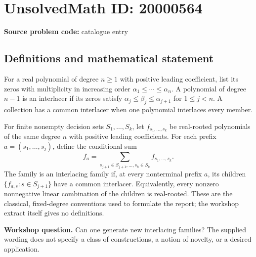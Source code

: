 \documentclass[11pt]{article}
\begin{document}
\section*{UnsolvedMath ID: 20000564}
\textbf{Source problem code:} catalogue entry
\subsection{Definitions and mathematical statement}
For a real polynomial of degree $n\geq 1$ with positive leading coefficient, list its zeros with multiplicity in increasing order $\alpha_1\leq\cdots\leq\alpha_n$. A polynomial of degree $n-1$ is an interlacer if its zeros satisfy $\alpha_j\leq\beta_j\leq\alpha_{j+1}$ for $1\leq j<n$. A collection has a common interlacer when one polynomial interlaces every member.

For finite nonempty decision sets $S_1,\ldots,S_k$, let $f_{s_1,\ldots,s_k}$ be real-rooted polynomials of the same degree $n$ with positive leading coefficients. For each prefix $a=(s_1,\ldots,s_j)$, define the conditional sum
\[
 f_a=\sum_{s_{j+1}\in S_{j+1},\ldots,s_k\in S_k}f_{s_1,\ldots,s_k}.
\]
The family is an interlacing family if, at every nonterminal prefix $a$, its children $\{f_{a,s}:s\in S_{j+1}\}$ have a common interlacer. Equivalently, every nonzero nonnegative linear combination of the children is real-rooted. These are the classical, fixed-degree conventions used to formulate the report; the workshop extract itself gives no definitions.

\textbf{Workshop question.} Can one generate new interlacing families? The supplied wording does not specify a class of constructions, a notion of novelty, or a desired application.
\end{document}
